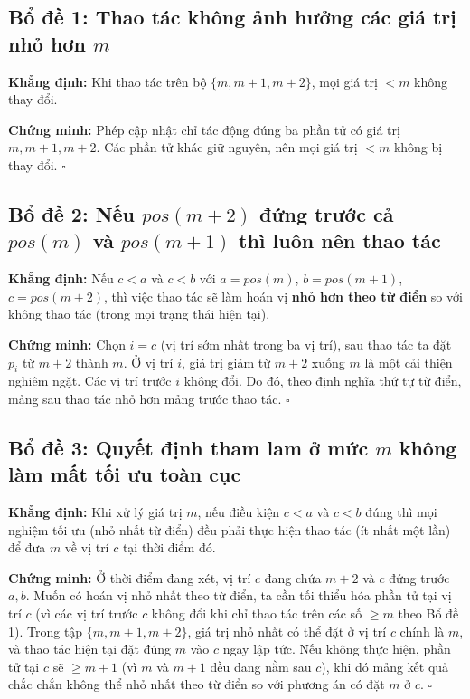 \documentclass[12pt,a4paper]{article}
\begin{document}
\subsection*{Bổ đề 1: Thao tác không ảnh hưởng các giá trị nhỏ hơn $m$}
\textbf{Khẳng định:} Khi thao tác trên bộ $\{m,m{+}1,m{+}2\}$, mọi giá trị $<m$ không thay đổi.

\textbf{Chứng minh:} Phép cập nhật chỉ tác động đúng ba phần tử có giá trị $m,m{+}1,m{+}2$. Các phần tử khác giữ nguyên, nên mọi giá trị $<m$ không bị thay đổi. \hfill$\square$

\subsection*{Bổ đề 2: Nếu $pos(m{+}2)$ đứng trước cả $pos(m)$ và $pos(m{+}1)$ thì luôn nên thao tác}
\textbf{Khẳng định:} Nếu $c<a$ và $c<b$ với $a=pos(m)$, $b=pos(m{+}1)$, $c=pos(m{+}2)$, thì việc thao tác sẽ làm hoán vị \textbf{nhỏ hơn theo từ điển} so với không thao tác (trong mọi trạng thái hiện tại).

\textbf{Chứng minh:}
Chọn $i=c$ (vị trí sớm nhất trong ba vị trí), sau thao tác ta đặt $p_i$ từ $m{+}2$ thành $m$.
Ở vị trí $i$, giá trị giảm từ $m{+}2$ xuống $m$ là một cải thiện nghiêm ngặt.
Các vị trí trước $i$ không đổi. Do đó, theo định nghĩa thứ tự từ điển, mảng sau thao tác nhỏ hơn mảng trước thao tác. \hfill$\square$

\subsection*{Bổ đề 3: Quyết định tham lam ở mức $m$ không làm mất tối ưu toàn cục}
\textbf{Khẳng định:} Khi xử lý giá trị $m$, nếu điều kiện $c<a$ và $c<b$ đúng thì mọi nghiệm tối ưu (nhỏ nhất từ điển) đều phải thực hiện thao tác (ít nhất một lần) để đưa $m$ về vị trí $c$ tại thời điểm đó.

\textbf{Chứng minh:}
Ở thời điểm đang xét, vị trí $c$ đang chứa $m{+}2$ và $c$ đứng trước $a,b$.
Muốn có hoán vị nhỏ nhất theo từ điển, ta cần tối thiểu hóa phần tử tại vị trí $c$ (vì các vị trí trước $c$ không đổi khi chỉ thao tác trên các số $\ge m$ theo Bổ đề 1).
Trong tập $\{m,m{+}1,m{+}2\}$, giá trị nhỏ nhất có thể đặt ở vị trí $c$ chính là $m$, và thao tác hiện tại đặt đúng $m$ vào $c$ ngay lập tức.
Nếu không thực hiện, phần tử tại $c$ sẽ $\ge m{+}1$ (vì $m$ và $m{+}1$ đều đang nằm sau $c$), khi đó mảng kết quả chắc chắn không thể nhỏ nhất theo từ điển so với phương án có đặt $m$ ở $c$. \hfill$\square$
\end{document}
